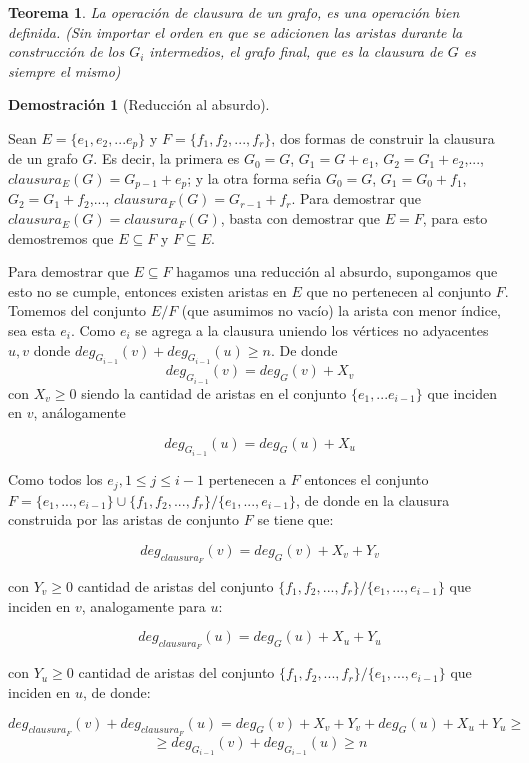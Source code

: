 \documentclass[a4paper,1pt]{report}
\newtheorem*{teo}{Teorema}
\newtheorem*{dem}{Demostración}
\begin{document}
\begin{teo}
La operaci\'on de clausura de un grafo, es una operaci\'on bien definida. (Sin importar el orden en que se adicionen las aristas durante la construcci\'on de los $G_i$ intermedios, el grafo final, que es la clausura de $G$ es siempre el mismo)
\end{teo}

\begin{dem}[Reducci\'on al absurdo]\end{dem}
Sean $E = \{e_1,e_2, ... e_p\}$ y $F = \{f_1,f_2,..., f_r\}$, dos formas de construir la clausura de un grafo $G$. Es decir, la primera es $G_0 = G$, $G_1 = G + e_1$, $G_2 = G_1 + e_2$,..., $clausura_E(G) = G_{p-1} + e_{p}$; y la otra forma se\'ria $G_0 = G$, $G_1 = G_0 + f_1$, $G_2 = G_1 + f_2$,..., $clausura_F(G) = G_{r-1} + f_r$.
Para demostrar que $clausura_E(G) = clausura_F(G)$, basta con demostrar que $E = F$, para esto demostremos que $E \subseteq F$ y $F \subseteq E$. 

Para demostrar que $E \subseteq F$ hagamos una reducci\'on al absurdo, supongamos que esto no se cumple, entonces existen aristas en $E$ que no pertenecen al conjunto $F$. Tomemos del conjunto $E/F$ (que asumimos no vac\'io) la arista con menor \'indice, sea esta $e_i$. Como $e_i$ se agrega a la clausura uniendo los v\'ertices no adyacentes $u,v$ donde $deg_{G_{i-1}}(v) + deg_{G_{i-1}}(u) \geq n$. 
De donde $$deg_{G_{i-1}}(v) = deg_{G}(v) + X_v $$ con $X_v \geq 0$ siendo la cantidad de aristas en el conjunto $\{e_1, ...e_{i-1}\}$ que inciden en $v$, an\'alogamente 

$$deg_{G_{i-1}}(u) = deg_{G}(u) + X_u $$

Como todos los $e_j, 1\leq j \leq i-1$ pertenecen a $F$ entonces el conjunto $F = \{e_1, ..., e_{i-1} \} \cup \{f_1,f_2,..., f_r\}/\{e_1, ..., e_{i-1} \}$, de donde en la clausura construida por las aristas de conjunto $F$ se tiene que:

$$deg_{clausura_F}(v) = deg_G(v) +  X_v + Y_v$$

con $Y_v \geq 0$ cantidad de aristas del conjunto $\{f_1,f_2,..., f_r\}/\{e_1, ..., e_{i-1} \}$ que inciden en $v$, analogamente para $u$:


$$deg_{clausura_F}(u) = deg_G(u) +  X_u + Y_u$$

con $Y_u \geq 0$ cantidad de aristas del conjunto $\{f_1,f_2,..., f_r\}/\{e_1, ..., e_{i-1} \}$ que inciden en $u$, de donde:

$$deg_{clausura_F}(v) + deg_{clausura_F}(u) = deg_G(v) +  X_v + Y_v + deg_G(u) +  X_u + Y_u \geq $$
$$\geq deg_{G_{i-1}}(v) + deg_{G_{i-1}}(u) \geq n $$
\end{document}

